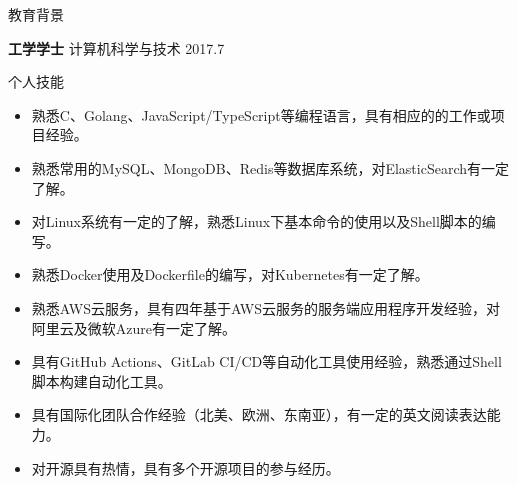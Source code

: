 \documentclass{resume} %
\begin{document}

\begin{rSection}{教育背景}

  {\bf 工学学士} 计算机科学与技术 \hfill {2017.7}

\end{rSection}

\begin{rSection}{个人技能}
  \begin{itemize}
    \itemsep -3pt {}
    \item 熟悉C、Golang、JavaScript/TypeScript等编程语言，具有相应的的工作或项目经验。
    \item 熟悉常用的MySQL、MongoDB、Redis等数据库系统，对ElasticSearch有一定了解。
    \item 对Linux系统有一定的了解，熟悉Linux下基本命令的使用以及Shell脚本的编写。
    \item 熟悉Docker使用及Dockerfile的编写，对Kubernetes有一定了解。
    \item 熟悉AWS云服务，具有四年基于AWS云服务的服务端应用程序开发经验，对阿里云及微软Azure有一定了解。
    \item 具有GitHub Actions、GitLab CI/CD等自动化工具使用经验，熟悉通过Shell脚本构建自动化工具。
    \item 具有国际化团队合作经验（北美、欧洲、东南亚），有一定的英文阅读表达能力。
    \item 对开源具有热情，具有多个开源项目的参与经历。
  \end{itemize}
\end{rSection}
\end{document}
